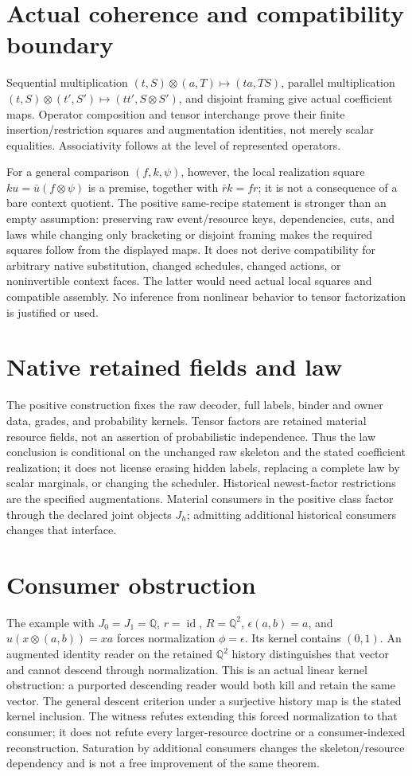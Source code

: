 \documentclass{article}
\begin{document}
\section*{Actual coherence and compatibility boundary}
Sequential multiplication $(t,S)\otimes(a,T)\mapsto(ta,TS)$, parallel multiplication $(t,S)\otimes(t',S')\mapsto(tt',S\otimes S')$, and disjoint framing give actual coefficient maps. Operator composition and tensor interchange prove their finite insertion/restriction squares and augmentation identities, not merely scalar equalities. Associativity follows at the level of represented operators.

For a general comparison $(f,k,\psi)$, however, the local realization square
$ku=\bar u(f\otimes\psi)$ is a premise, together with $\bar r k=fr$; it is not a consequence of a bare context quotient. The positive same-recipe statement is stronger than an empty assumption: preserving raw event/resource keys, dependencies, cuts, and laws while changing only bracketing or disjoint framing makes the required squares follow from the displayed maps. It does not derive compatibility for arbitrary native substitution, changed schedules, changed actions, or noninvertible context faces. The latter would need actual local squares and compatible assembly. No inference from nonlinear behavior to tensor factorization is justified or used.

\section*{Native retained fields and law}
The positive construction fixes the raw decoder, full labels, binder and owner data, grades, and probability kernels. Tensor factors are retained material resource fields, not an assertion of probabilistic independence. Thus the law conclusion is conditional on the unchanged raw skeleton and the stated coefficient realization; it does not license erasing hidden labels, replacing a complete law by scalar marginals, or changing the scheduler. Historical newest-factor restrictions are the specified augmentations. Material consumers in the positive class factor through the declared joint objects $J_h$; admitting additional historical consumers changes that interface.

\section*{Consumer obstruction}
The example with $J_0=J_1=\mathbb Q$, $r=\operatorname{id}$, $R=\mathbb Q^2$, $\epsilon(a,b)=a$, and $u(x\otimes(a,b))=xa$ forces normalization $\phi=\epsilon$. Its kernel contains $(0,1)$. An augmented identity reader on the retained $\mathbb Q^2$ history distinguishes that vector and cannot descend through normalization. This is an actual linear kernel obstruction: a purported descending reader would both kill and retain the same vector. The general descent criterion under a surjective history map is the stated kernel inclusion. The witness refutes extending this forced normalization to that consumer; it does not refute every larger-resource doctrine or a consumer-indexed reconstruction. Saturation by additional consumers changes the skeleton/resource dependency and is not a free improvement of the same theorem.
\end{document}
